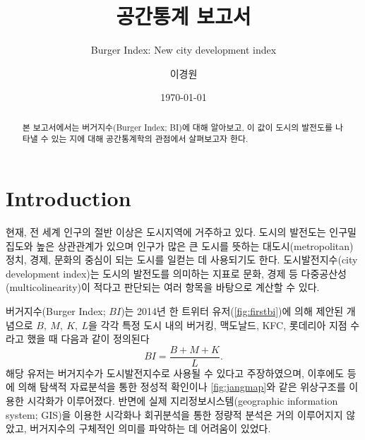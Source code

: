 \documentclass{scrartcl}
\begin{document}
\title{공간통계 보고서}
\subtitle{Burger Index: New city development index}
\author{이경원}
\date{\today}
\maketitle


\begin{abstract}
    본 보고서에서는 버거지수(Burger Index; BI)에 대해 알아보고, 이 값이 도시의 발전도를 나타낼 수 있는 지에 대해 공간통계학의 관점에서 살펴보고자 한다. 
\end{abstract}

\section{Introduction}   

현재, 전 세계 인구의 절반 이상은 도시지역에 거주하고 있다. 도시의 발전도는 인구밀집도와 높은 상관관계가 있으며 인구가 많은 큰 도시를 뜻하는 대도시(metropolitan)\가 정치, 경제, 문화의 중심이 되는 도시를 일컫는 데 사용되기도 한다. 도시발전지수(city development index)는 도시의 발전도를 의미하는 지표로 문화, 경제 등 다중공산성(multicolinearity)이 적다고 판단되는 여러 항목을 바탕으로 계산할 수 있다. 

버거지수(Burger Index; $BI$)는 2014년 한 트위터 유저(\autoref{fig:firstbi})에 의해 제안된 개념으로 $B,~M,~K,~L$을 각각 특정 도시 내의 버거킹, 맥도날드, KFC, 롯데리아 지점 수라고 했을 때 다음과 같이 정의된다
\begin{equation}\label{eqn:originbi}
    BI = \frac{B+M+K}{L}.
\end{equation}
해당 유저는 버거지수가 도시발전지수로 사용될 수 있다고 주장하였으며, 이후에도 \citet{jang2014} 등에 의해 탐색적 자료분석을 통한 정성적 확인이나 \autoref{fig:jangmap}와 같은 위상구조를 이용한 시각화가 이루어졌다. 반면에 실제 지리정보시스템(geographic information system; GIS)을 이용한 시각화나 회귀분석을 통한 정량적 분석은 거의 이루어지지 않았고, 버거지수의 구체적인 의미를 파악하는 데 어려움이 있었다.
\end{document}
